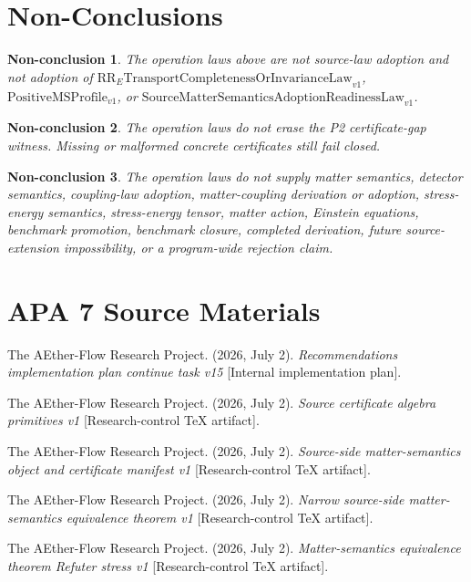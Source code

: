 \documentclass[11pt]{article}
\newcommand{\RRELaw}{\mathrm{RR}_{E}\mathrm{TransportCompletenessOrInvarianceLaw}_{v1}}
\newcommand{\PositiveMSProfile}{\mathrm{PositiveMSProfile}_{v1}}
\newcommand{\SMSAR}{\mathrm{SourceMatterSemanticsAdoptionReadinessLaw}_{v1}}
\newtheorem{nonconclusion}{Non-conclusion}
\begin{document}
\section{Non-Conclusions}

\begin{nonconclusion}
The operation laws above are not source-law adoption and not adoption of
\(\RRELaw\), \(\PositiveMSProfile\), or \(\SMSAR\).
\end{nonconclusion}

\begin{nonconclusion}
The operation laws do not erase the P2 certificate-gap witness. Missing or
malformed concrete certificates still fail closed.
\end{nonconclusion}

\begin{nonconclusion}
The operation laws do not supply matter semantics, detector semantics,
coupling-law adoption, matter-coupling derivation or adoption, stress-energy
semantics, stress-energy tensor, matter action, Einstein equations, benchmark
promotion, benchmark closure, completed derivation, future source-extension
impossibility, or a program-wide rejection claim.
\end{nonconclusion}

\section{APA 7 Source Materials}

The AEther-Flow Research Project. (2026, July 2). \textit{Recommendations
implementation plan continue task v15} [Internal implementation plan].

The AEther-Flow Research Project. (2026, July 2). \textit{Source certificate
algebra primitives v1} [Research-control TeX artifact].

The AEther-Flow Research Project. (2026, July 2). \textit{Source-side
matter-semantics object and certificate manifest v1} [Research-control TeX
artifact].

The AEther-Flow Research Project. (2026, July 2). \textit{Narrow source-side
matter-semantics equivalence theorem v1} [Research-control TeX artifact].

The AEther-Flow Research Project. (2026, July 2). \textit{Matter-semantics
equivalence theorem Refuter stress v1} [Research-control TeX artifact].
\end{document}
